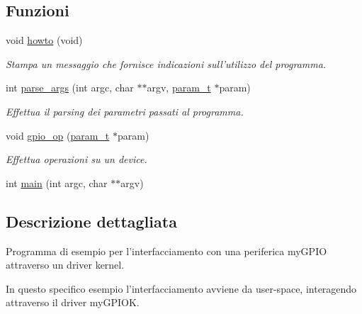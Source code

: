 \subsection*{Funzioni}
\begin{DoxyCompactItemize}
\item 
void \hyperlink{group__userspace-gpio_ga05909651fa170a63e98e3f8e13451b7b}{howto} (void)
\begin{DoxyCompactList}\small\item\em Stampa un messaggio che fornisce indicazioni sull'utilizzo del programma. \end{DoxyCompactList}\item 
int \hyperlink{group__userspace-gpio_ga65d977fb03a14dedd76e1515d6d24ff4}{parse\+\_\+args} (int argc, char $\ast$$\ast$argv, \hyperlink{structparam__t}{param\+\_\+t} $\ast$param)
\begin{DoxyCompactList}\small\item\em Effettua il parsing dei parametri passati al programma. \end{DoxyCompactList}\item 
void \hyperlink{group__userspace-gpio_ga63fab82d87963c07f9557a5f5d5d3e86}{gpio\+\_\+op} (\hyperlink{structparam__t}{param\+\_\+t} $\ast$param)
\begin{DoxyCompactList}\small\item\em Effettua operazioni su un device. \end{DoxyCompactList}\item 
int \hyperlink{group__userspace-gpio_ga3c04138a5bfe5d72780bb7e82a18e627}{main} (int argc, char $\ast$$\ast$argv)
\end{DoxyCompactItemize}


\subsection{Descrizione dettagliata}
Programma di esempio per l'interfacciamento con una periferica my\+G\+P\+I\+O attraverso un driver kernel. 

In questo specifico esempio l'interfacciamento avviene da user-\/space, interagendo attraverso il driver my\+G\+P\+I\+O\+K. 

